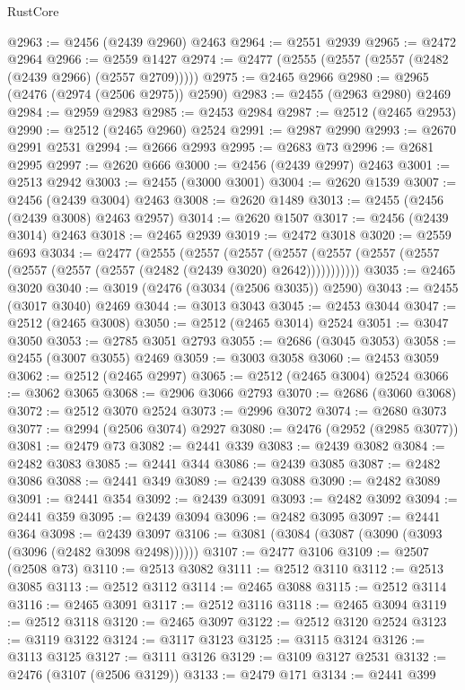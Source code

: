 \begin{lexlean}{RustCore}
\begin{coremodule}
@2963 := @2456 (@2439 @2960) @2463
@2964 := @2551 @2939
@2965 := @2472 @2964
@2966 := @2559 @1427
@2974 := @2477 (@2555 (@2557 (@2557 (@2482 (@2439 @2966) (@2557 @2709)))))
@2975 := @2465 @2966
@2980 := @2965 (@2476 (@2974 (@2506 @2975)) @2590)
@2983 := @2455 (@2963 @2980) @2469
@2984 := @2959 @2983
@2985 := @2453 @2984
@2987 := @2512 (@2465 @2953)
@2990 := @2512 (@2465 @2960) @2524
@2991 := @2987 @2990
@2993 := @2670 @2991 @2531
@2994 := @2666 @2993
@2995 := @2683 @73
@2996 := @2681 @2995
@2997 := @2620 @666
@3000 := @2456 (@2439 @2997) @2463
@3001 := @2513 @2942
@3003 := @2455 (@3000 @3001)
@3004 := @2620 @1539
@3007 := @2456 (@2439 @3004) @2463
@3008 := @2620 @1489
@3013 := @2455 (@2456 (@2439 @3008) @2463 @2957)
@3014 := @2620 @1507
@3017 := @2456 (@2439 @3014) @2463
@3018 := @2465 @2939
@3019 := @2472 @3018
@3020 := @2559 @693
@3034 := @2477
    (@2555
      (@2557
        (@2557
          (@2557 (@2557 (@2557 (@2557 (@2557 (@2557 (@2557 (@2482 (@2439 @3020) @2642)))))))))))
@3035 := @2465 @3020
@3040 := @3019 (@2476 (@3034 (@2506 @3035)) @2590)
@3043 := @2455 (@3017 @3040) @2469
@3044 := @3013 @3043
@3045 := @2453 @3044
@3047 := @2512 (@2465 @3008)
@3050 := @2512 (@2465 @3014) @2524
@3051 := @3047 @3050
@3053 := @2785 @3051 @2793
@3055 := @2686 (@3045 @3053)
@3058 := @2455 (@3007 @3055) @2469
@3059 := @3003 @3058
@3060 := @2453 @3059
@3062 := @2512 (@2465 @2997)
@3065 := @2512 (@2465 @3004) @2524
@3066 := @3062 @3065
@3068 := @2906 @3066 @2793
@3070 := @2686 (@3060 @3068)
@3072 := @2512 @3070 @2524
@3073 := @2996 @3072
@3074 := @2680 @3073
@3077 := @2994 (@2506 @3074) @2927
@3080 := @2476 (@2952 (@2985 @3077))
@3081 := @2479 @73
@3082 := @2441 @339
@3083 := @2439 @3082
@3084 := @2482 @3083
@3085 := @2441 @344
@3086 := @2439 @3085
@3087 := @2482 @3086
@3088 := @2441 @349
@3089 := @2439 @3088
@3090 := @2482 @3089
@3091 := @2441 @354
@3092 := @2439 @3091
@3093 := @2482 @3092
@3094 := @2441 @359
@3095 := @2439 @3094
@3096 := @2482 @3095
@3097 := @2441 @364
@3098 := @2439 @3097
@3106 := @3081 (@3084 (@3087 (@3090 (@3093 (@3096 (@2482 @3098 @2498))))))
@3107 := @2477 @3106
@3109 := @2507 (@2508 @73)
@3110 := @2513 @3082
@3111 := @2512 @3110
@3112 := @2513 @3085
@3113 := @2512 @3112
@3114 := @2465 @3088
@3115 := @2512 @3114
@3116 := @2465 @3091
@3117 := @2512 @3116
@3118 := @2465 @3094
@3119 := @2512 @3118
@3120 := @2465 @3097
@3122 := @2512 @3120 @2524
@3123 := @3119 @3122
@3124 := @3117 @3123
@3125 := @3115 @3124
@3126 := @3113 @3125
@3127 := @3111 @3126
@3129 := @3109 @3127 @2531
@3132 := @2476 (@3107 (@2506 @3129))
@3133 := @2479 @171
@3134 := @2441 @399

\end{coremodule}
\end{lexlean}
